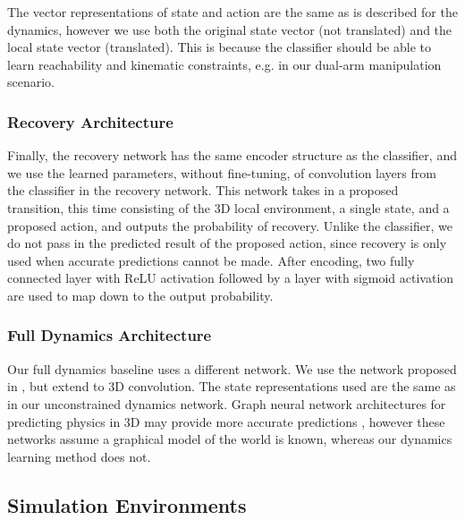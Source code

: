 The vector representations of state and action are the same as is described for the dynamics, however we use both the original state vector (not translated) and the local state vector (translated). This is because the classifier should be able to learn reachability and kinematic constraints, e.g. in our dual-arm manipulation scenario. 

\subsubsection{Recovery Architecture}

Finally, the recovery network has the same encoder structure as the classifier, and we use the learned parameters, without fine-tuning, of convolution layers from the classifier in the recovery network. This network takes in a proposed transition, this time consisting of the 3D local environment, a single state, and a proposed action, and outputs the probability of recovery. Unlike the classifier, we do not pass in the predicted result of the proposed action, since recovery is only used when accurate predictions cannot be made. After encoding, two fully connected layer with ReLU activation followed by a layer with sigmoid activation are used to map down to the output probability.

\subsubsection{Full Dynamics Architecture}

Our full dynamics baseline uses a different network. We use the network proposed in \cite{NagabandiImageConditiondDynamics2018}, but extend to 3D convolution. The state representations used are the same as in our unconstrained dynamics network. Graph neural network architectures for predicting physics in 3D may provide more accurate predictions \cite{Propnet,Mrowca2018}, however these networks assume a graphical model of the world is known, whereas our dynamics learning method does not.

\subsection{Simulation Environments}
\label{Scirob:sec:sim_envs}

